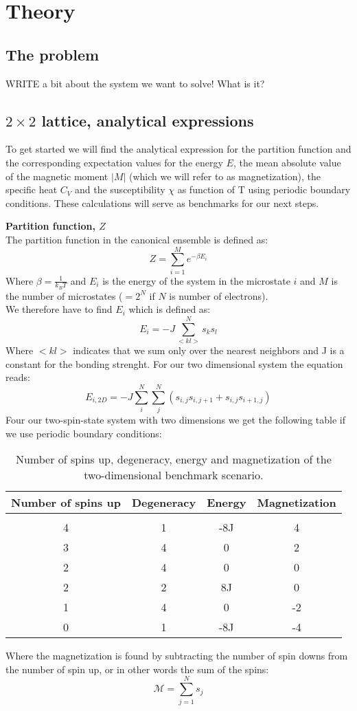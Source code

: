 \documentclass[../main.tex]{subfiles}
\begin{document}
  \section{Theory}
  \subsection{The problem}
    WRITE a bit about the system we want to solve! What is it?

  \subsection{$2 \times 2$ lattice, analytical expressions} \label{sec:theory-analy}
    To get started we will find the analytical expression for the partition function and the corresponding expectation values for the energy $E$, the mean absolute value of the magnetic moment $|M|$ (which we will refer to as magnetization), the specific heat $C_V$ and the susceptibility $\chi$ as function of T using periodic boundary conditions. These calculations will serve as benchmarks for our next steps.

    \textbf{Partition function, $Z$}\\
    The partition function in the canonical ensemble is defined as:
    \[ Z = \sum_{i=1}^M e^{-\beta E_i}\]
    Where $\beta =\frac{1}{k_B T}$ and $E_i$ is the energy of the system in the microstate $i$ and $M$ is the number of microstates ($=2^N$ if $N$ is number of electrons).
    \\
    We therefore have to find $E_i$ which is defined as:
    \[E_i = -J \sum_{<kl>}^N s_k s_l\]
    Where $<kl>$ indicates that we sum only over the nearest neighbors and J is a constant for the bonding strenght. For our two dimensional system the equation reads:
    \[E_{i,2D} = -J \sum_i^N \sum_j^N \left(s_{i,j}s_{i,j+1} + s_{i,j}s_{i+1,j}\right)\]
    Four our two-spin-state system with two dimensions we get the following table if we use periodic boundary conditions:
    \begin{table}[!h]
    \begin{center}
      \begin{tabular}{c c c c}
        Number of spins up & Degeneracy & Energy & Magnetization\\
        \hline\\
        4 & 1 & -8J & 4\\
        3 & 4 & 0 & 2 \\
        2 & 4 & 0 & 0\\
        2 & 2 & 8J & 0 \\
        1 & 4 & 0 & -2 \\
        0 & 1 & -8J & -4
      \end{tabular}
      \caption{Number of spins up, degeneracy, energy and magnetization of the two-dimensional benchmark scenario.}
      \label{tab:2x2spinsEnergiesMags}
    \end{center}
    \end{table}
    \FloatBarrier
    Where the magnetization is found by subtracting the number of spin downs from the number of spin up, or in other words the sum of the spins:
    \[\mathcal{M} = \sum_{j=1}^N s_j\]
\end{document}
